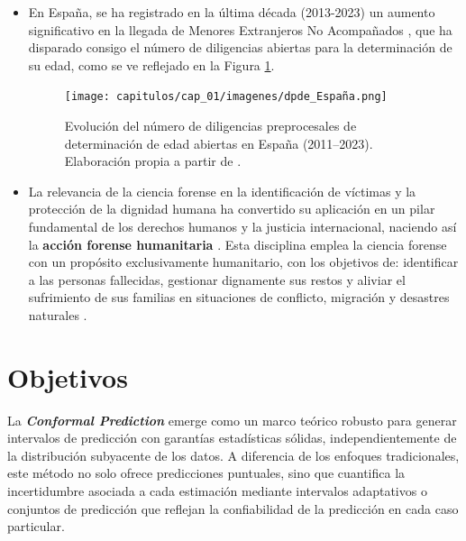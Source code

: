 \begin{itemize}
    \item En España, se ha registrado en la última década (2013-2023) un aumento significativo en la llegada
    de Menores Extranjeros No Acompañados \cite{fge2024,fge2019,fge2016,fge2013}, que ha disparado 
    consigo el número de diligencias abiertas para la determinación de su edad, como se ve reflejado 
    en la Figura \ref{fig:evolucion_DPDE}.

    \begin{figure}[h]
        \centering
        \texttt{[image: capitulos/cap\_01/imagenes/dpde\_España.png]}
        \caption{
            Evolución del número de diligencias preprocesales de determinación de edad abiertas en 
            España (2011–2023). 
            Elaboración propia a partir de \cite{fge2013,fge2016,fge2019, fge2024}.
        } 
        \label{fig:evolucion_DPDE}
    \end{figure}

    \item La relevancia de la ciencia forense en la identificación de víctimas y la protección de la dignidad 
    humana ha convertido su aplicación en un pilar fundamental de los derechos humanos y la justicia 
    internacional, naciendo así la  \textbf{acción forense humanitaria} \cite{cordner2017}. Esta disciplina 
    emplea la ciencia forense con un propósito exclusivamente humanitario, con los objetivos de: identificar 
    a las personas fallecidas, gestionar dignamente sus restos y aliviar el sufrimiento de sus familias en 
    situaciones de conflicto, migración y desastres naturales \cite{tidballbinz2021}. 

\end{itemize}


\section{Objetivos}

La \textbf{\textit{Conformal Prediction}} emerge como un marco teórico robusto para generar intervalos de 
predicción con garantías estadísticas sólidas, independientemente de la distribución subyacente de los datos. 
A diferencia de los enfoques tradicionales, este método no solo ofrece predicciones puntuales, sino que 
cuantifica la incertidumbre asociada a cada estimación mediante intervalos adaptativos o conjuntos de 
predicción que reflejan la confiabilidad de la predicción en cada caso particular.

